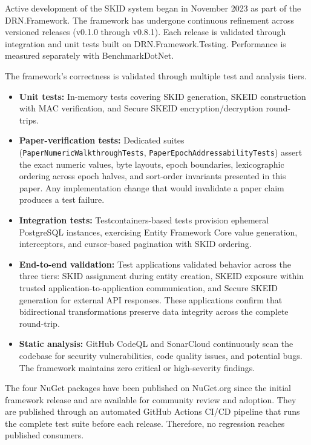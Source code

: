 \documentclass[fleqn,10pt]{wlpeerj}
\providecommand{\tightlist}{%
  \setlength{\itemsep}{0pt}\setlength{\parskip}{0pt}}
\begin{document}
Active development of the SKID system began in November 2023 as part of
the DRN.Framework. The framework has undergone continuous refinement
across versioned releases (v0.1.0 through v0.8.1). Each release is
validated through integration and unit tests built on
DRN.Framework.Testing. Performance is measured separately with
BenchmarkDotNet.

The framework's correctness is validated through multiple test and
analysis tiers.

\begin{itemize}
\tightlist
\item
  \textbf{Unit tests:} In-memory tests covering SKID generation, SKEID
  construction with MAC verification, and Secure SKEID
  encryption/decryption round-trips.
\item
  \textbf{Paper-verification tests:} Dedicated suites
  (\texttt{PaperNumericWalkthroughTests},
  \texttt{PaperEpochAddressabilityTests}) assert the exact numeric
  values, byte layouts, epoch boundaries, lexicographic ordering across
  epoch halves, and sort-order invariants presented in this paper. Any
  implementation change that would invalidate a paper claim produces a
  test failure.
\item
  \textbf{Integration tests:} Testcontainers-based tests provision
  ephemeral PostgreSQL instances, exercising Entity Framework Core value
  generation, interceptors, and cursor-based pagination with SKID
  ordering.
\item
  \textbf{End-to-end validation:} Test applications validated behavior
  across the three tiers: SKID assignment during entity creation, SKEID
  exposure within trusted application-to-application communication, and
  Secure SKEID generation for external API responses. These applications
  confirm that bidirectional transformations preserve data integrity
  across the complete round-trip.
\item
  \textbf{Static analysis:} GitHub CodeQL and SonarCloud continuously
  scan the codebase for security vulnerabilities, code quality issues,
  and potential bugs. The framework maintains zero critical or
  high-severity findings.
\end{itemize}

The four NuGet packages have been published on NuGet.org since the
initial framework release and are available for community review and
adoption. They are published through an automated GitHub Actions CI/CD
pipeline that runs the complete test suite before each release.
Therefore, no regression reaches published consumers.
\end{document}
